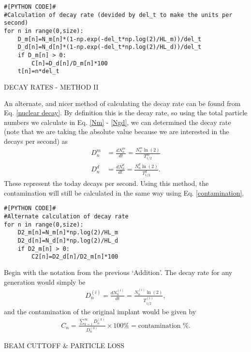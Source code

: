\begin{lstlisting}
#[PYTHON CODE]#
#Calculation of decay rate (devided by del_t to make the units per second)
for n in range(0,size):
	D_m[n]=N_m[n]*(1-np.exp(-del_t*np.log(2)/HL_m))/del_t
	D_d[n]=N_d[n]*(1-np.exp(-del_t*np.log(2)/HL_d))/del_t
	if D_m[n] > 0:
		C[n]=D_d[n]/D_m[n]*100
	t[n]=n*del_t
\end{lstlisting}

\begin{center}
	DECAY RATES - METHOD II
\end{center}

An alternate, and nicer method of calculating the decay rate can be found from Eq. \ref{nuclear decay}. By definition this is the decay rate, so using the total particle numbers we calculate in Eq. \ref{Nm} - \ref{Ngd}, we can determined the decay rate (note that we are taking the absolute value because we are interested in the decays per second) as
\begin{align}
D^m_n &= \frac{dN^m_n}{dt} = \frac{N^m_n \ln(2)}{T^m_{1/2}} \\
D^d_n &= \frac{dN^d_n}{dt} = \frac{N^d_n \ln(2)}{T^d_{1/2}}.
\end{align}
These represent the today decays per second. Using this method, the contamination will still be calculated in the same way using Eq. \ref{contamination}.

\begin{lstlisting}
#[PYTHON CODE]#
#Alternate calculation of decay rate
for n in range(0,size):
	D2_m[n]=N_m[n]*np.log(2)/HL_m
	D2_d[n]=N_d[n]*np.log(2)/HL_d
	if D2_m[n] > 0:
		C2[n]=D2_d[n]/D2_m[n]*100
\end{lstlisting}

\begin{Addition}
	Begin with the notation from the previous `Addition'. The decay rate for any generation would simply be
	\begin{align}
	D^{(i)}_n = \frac{dN^{(i)}_n}{dt} = \frac{N^{(i)}_n \ln(2)}{T^{(i)}_{1/2}}, \label{DecayRate_i}
	\end{align}
	and the contamination of the original implant would be given by
	\begin{align}
	C_n=\frac{\sum_{k=1}^{\infty}D^{(k)}_n}{D^{(0)}_n} \times 100  \%=\textrm{contamination \%}. \label{contamination_i}
	\end{align}
\end{Addition}

\begin{center}
	BEAM CUTTOFF \& PARTICLE LOSS
\end{center}

